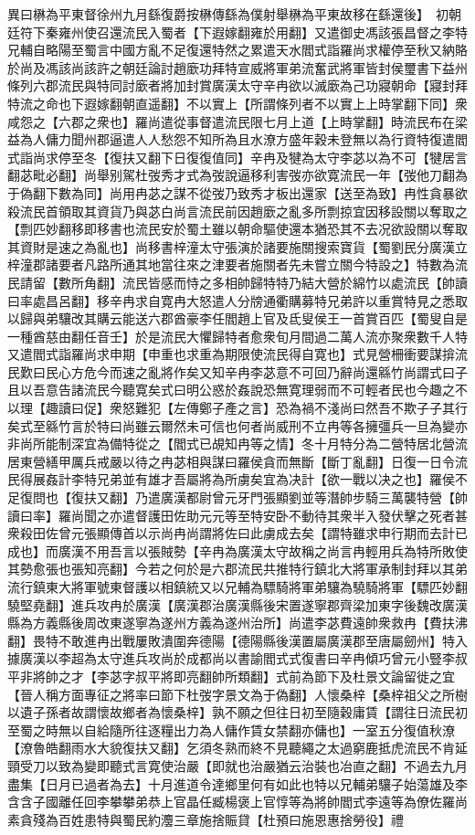 異曰楙為平東督徐州九月繇復爵按楙傳繇為僕射舉楙為平東故移在繇還後】　初朝廷符下秦雍州使召還流民入蜀者【下遐嫁翻雍於用翻】又遣御史馮該張昌督之李特兄輔自略陽至蜀言中國方亂不足復還特然之累遣天水閻式詣羅尚求權停至秋又納賂於尚及馮該尚該許之朝廷論討趙廞功拜特宣威將軍弟流奮武將軍皆封侯璽書下益州條列六郡流民與特同討廞者將加封賞廣漢太守辛冉欲以滅廞為己功寢朝命【寢封拜特流之命也下遐嫁翻朝直遥翻】不以實上【所謂條列者不以實上上時掌翻下同】衆咸怨之【六郡之衆也】羅尚遣從事督遣流民限七月上道【上時掌翻】時流民布在梁益為人傭力聞州郡逼遣人人愁怨不知所為且水潦方盛年穀未登無以為行資特復遣閻式詣尚求停至冬【復扶又翻下日復復值同】辛冉及犍為太守李苾以為不可【犍居言翻苾毗必翻】尚舉别駕杜弢秀才式為弢說逼移利害弢亦欲寛流民一年【弢他刀翻為于偽翻下數為同】尚用冉苾之謀不從弢乃致秀才板出還家【送至為致】冉性貪暴欲殺流民首領取其資貨乃與苾白尚言流民前因趙廞之亂多所剽掠宜因移設關以奪取之【剽匹妙翻移即移書也流民安於蜀土雖以朝命驅使還本猶恐其不去况欲設關以奪取其資財是速之為亂也】尚移書梓潼太守張演於諸要施關搜索寶貨【蜀劉民分廣漢立梓潼郡諸要者凡路所通其地當往來之津要者施關者先未嘗立關今特設之】特數為流民請留【數所角翻】流民皆感而恃之多相帥歸特特乃結大營於綿竹以處流民【帥讀曰率處昌呂翻】移辛冉求自寛冉大怒遣人分牓通衢購募特兄弟許以重賞特見之悉取以歸與弟驤改其購云能送六郡酋豪李任閻趙上官及氐叟侯王一首賞百匹【蜀叟自是一種酋慈由翻任音壬】於是流民大懼歸特者愈衆旬月間過二萬人流亦聚衆數千人特又遣閻式詣羅尚求申期【申重也求重為期限使流民得自寛也】式見營柵衝要謀揜流民歎曰民心方危今而速之亂將作矣又知辛冉李苾意不可回乃辭尚還緜竹尚謂式曰子且以吾意告諸流民今聽寛矣式曰明公惑於姦說恐無寛理弱而不可輕者民也今趣之不以理【趣讀曰促】衆怒難犯【左傳鄭子產之言】恐為禍不淺尚曰然吾不欺子子其行矣式至緜竹言於特曰尚雖云爾然未可信也何者尚威刑不立冉等各擁彊兵一旦為變亦非尚所能制深宜為備特從之【閻式已覘知冉等之情】冬十月特分為二營特居北營流居東營繕甲厲兵戒嚴以待之冉苾相與謀曰羅侯貪而無斷【斷丁亂翻】日復一日令流民得展姦計李特兄弟並有雄才吾屬將為所虜矣宜為决計【欲一戰以决之也】羅侯不足復問也【復扶又翻】乃遣廣漢都尉曾元牙門張顯劉並等潛帥步騎三萬襲特營【帥讀曰率】羅尚聞之亦遣督護田佐助元元等至特安卧不動待其衆半入發伏擊之死者甚衆殺田佐曾元張顯傳首以示尚冉尚謂將佐曰此虜成去矣【謂特雖求申行期而去計已成也】而廣漢不用吾言以張賊勢【辛冉為廣漢太守故稱之尚言冉輕用兵為特所敗使其勢愈張也張知亮翻】今若之何於是六郡流民共推特行鎮北大將軍承制封拜以其弟流行鎮東大將軍號東督護以相鎮統又以兄輔為驃騎將軍弟驤為驍騎將軍【驃匹妙翻驍堅堯翻】進兵攻冉於廣漢【廣漢郡治廣漢縣後宋置遂寧郡齊梁加東字後魏改廣漢縣為方義縣後周改東遂寧為遂州方義為遂州治所】尚遣李苾費遠帥衆救冉【費扶沸翻】畏特不敢進冉出戰屢敗潰圍奔德陽【德陽縣後漢置屬廣漢郡至唐屬劒州】特入據廣漢以李超為太守進兵攻尚於成都尚以書諭閻式式復書曰辛冉傾巧曾元小豎李叔平非將帥之才【李苾字叔平將即亮翻帥所類翻】式前為節下及杜景文論留徙之宜【晉人稱方面專征之將率曰節下杜弢字景文為于偽翻】人懷桑梓【桑梓祖父之所樹以遺子孫者故謂懷故鄉者為懷桑梓】孰不願之但往日初至隨穀庸賃【謂往日流民初至蜀之時無以自給隨所往逐糧出力為人傭作賃女禁翻亦傭也】一室五分復值秋潦【潦魯皓翻雨水大貌復扶又翻】乞須冬熟而終不見聽繩之太過窮鹿抵虎流民不肯延頸受刀以致為變即聽式言寛使治嚴【即就也治嚴猶云治裝也冶直之翻】不過去九月盡集【日月已過者為去】十月進道令達鄉里何有如此也特以兄輔弟驤子始蕩雄及李含含子國離任回李攀攀弟恭上官晶任臧楊褒上官惇等為將帥閻式李遠等為僚佐羅尚素貪殘為百姓患特與蜀民約灋三章施捨賑貸【杜預曰施恩惠捨勞役】禮